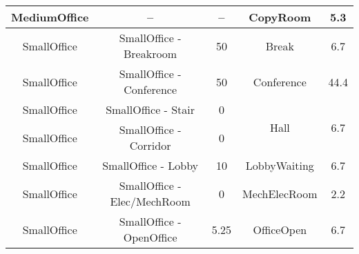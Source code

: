 \begin{table}
\begin{tabular}{|c|c|c|c|c|}
MediumOffice           & --                           & --                                                                                                            & CopyRoom                          & 5.3                                                                                                            \\ \hline
SmallOffice            & SmallOffice - Breakroom      & 50                                                                                                            & Break                             & 6.7                                                                                                            \\ \hline
SmallOffice            & SmallOffice - Conference     & 50                                                                                                            & Conference                        & 44.4                                                                                                           \\ \hline
SmallOffice            & SmallOffice - Stair          & 0                                                                                                             & \multirow{2}{*}{Hall}             & \multirow{2}{*}{6.7}                                                                                           \\ \cline{1-3}
SmallOffice            & SmallOffice - Corridor       & 0                                                                                                             &                                   &                                                                                                                \\ \hline
SmallOffice            & SmallOffice - Lobby          & 10                                                                                                            & LobbyWaiting                      & 6.7                                                                                                            \\ \hline
SmallOffice            & SmallOffice - Elec/MechRoom  & 0                                                                                                             & MechElecRoom                      & 2.2                                                                                                            \\ \hline
SmallOffice            & SmallOffice - OpenOffice     & 5.25                                                                                                          & OfficeOpen                        & 6.7                                                                                                            \\ \hline

\end{tabular}
\end{table}
